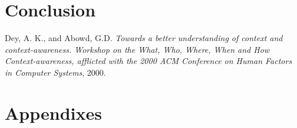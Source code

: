 \documentclass[]{report}
\begin{document}
\chapter{Conclusion}

\begin{thebibliography}{9}

  Dey, A. K., and Abowd, G.D.
  \emph{Towards a better understanding of context and context-awareness. Workshop on the What, Who, Where, When and How Context-awareness, afflicted with the 2000 ACM Conference on Human Factors in Computer Systems},
  2000.

\end{thebibliography}
\chapter{Appendixes}
\end{document}
